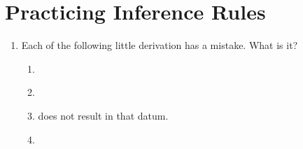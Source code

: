 \section*{Practicing Inference Rules}

\begin{enumerate}

 \item Each of the following little derivation has a mistake. What is it?

  \begin{enumerate}

   \item    
\begin{argumentN}[1]


\end{argumentN}


\item 

\begin{argumentN}[1]



\end{argumentN}


\item 
\begin{argumentN}[1]




\end{argumentN}

\opts{

 \dotline
 \dotline
}
{\conjI{} does not result in that datum.}

\item 
\begin{argumentN}[1]





\end{argumentN}
\end{enumerate}
\end{enumerate}
